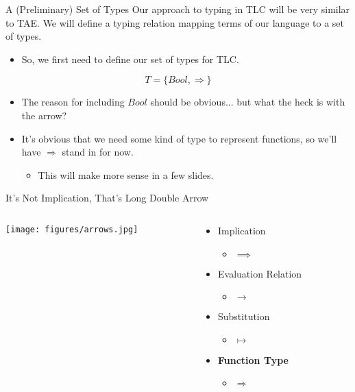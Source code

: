 \documentclass[11pt]{beamer}
\begin{document}
\begin{frame}[fragile=singleslide]{A (Preliminary) Set of Types}
Our approach to typing in TLC will be very similar to TAE.  We will define a typing relation mapping terms of our language to a set of types.  
\begin{itemize}
\item So, we first need to define our set of types for TLC.
\end{itemize}

\begin{equation}
T = \{ Bool, \Rightarrow\}
\end{equation}

\begin{itemize}
\item The reason for including $Bool$ should be obvious... but what the heck is with the arrow? 
\item It's obvious that we need some kind of type to represent functions, so we'll have $\Rightarrow$ stand in for now.   
\begin{itemize}
\item This will make more sense in a few slides.
\end{itemize}
\end{itemize}
\end{frame}

\begin{frame}[fragile=singleslide]{It's Not Implication, That's Long Double Arrow}
\begin{columns}
\begin{column}{0.5\textwidth}
\begin{center}
\texttt{[image: figures/arrows.jpg]}
\end{center}
\end{column}
\begin{column}{0.5\textwidth}
\begin{itemize}
\item Implication
\begin{itemize}
\item $\implies$
\end{itemize}
\item Evaluation Relation
\begin{itemize}
\item $\rightarrow$
\end{itemize}
\item Substitution
\begin{itemize}
\item $\mapsto$
\end{itemize}
\item \textbf{Function Type}
\begin{itemize}
\item $\Rightarrow$
\end{itemize}
\end{itemize}
\end{column}
\end{columns}
\end{frame}
\end{document}
